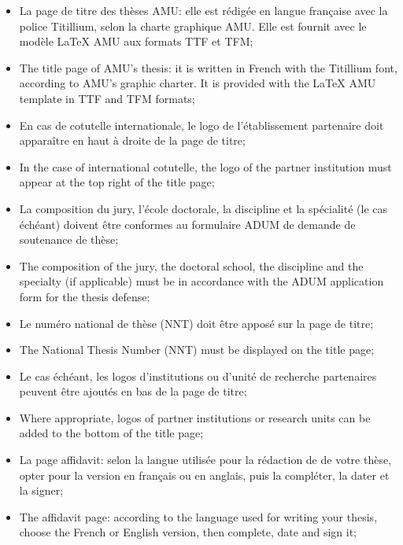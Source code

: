\begin{itemize}
	\item La page de titre des thèses AMU: elle est rédigée en langue française avec la police Titillium, selon la charte graphique AMU. Elle est fournit avec le modèle LaTeX AMU aux formats TTF et TFM;
	\item The title page of AMU’s thesis: it is written in French with the Titillium font, according to AMU’s graphic charter. It is provided with the LaTeX AMU template in TTF and TFM formats;
	\\

	\item En cas de cotutelle internationale, le logo de l’établissement partenaire doit apparaître en haut à droite de la page de titre;
	\item In the case of international cotutelle, the logo of the partner institution must appear at the top right of the title page;
	\\

	\item La composition du jury, l’école doctorale, la discipline et la spécialité (le cas échéant) doivent être conformes au formulaire ADUM de demande de soutenance de thèse;
	\item The composition of the jury, the doctoral school, the discipline and the specialty (if applicable) must be in accordance with the ADUM application form for the thesis defense;
	\\

	\item Le numéro national de thèse (NNT) doit être apposé sur la page de titre;
	\item The National Thesis Number (NNT) must be displayed on the title page;
	\\
	
	\item Le cas échéant, les logos d’institutions ou d’unité de recherche partenaires peuvent être ajoutés en bas de la page de titre;
	\item Where appropriate, logos of partner institutions or research units can be added to the bottom of the title page;
	\\

	\item La page affidavit: selon la langue utilisée pour la rédaction de de votre thèse, opter pour la version en français ou en anglais, puis la compléter, la dater et la signer;
	\item The affidavit page: according to the language used for writing your thesis, choose the French or English version, then complete, date and sign it;
	\\


\end{itemize}
